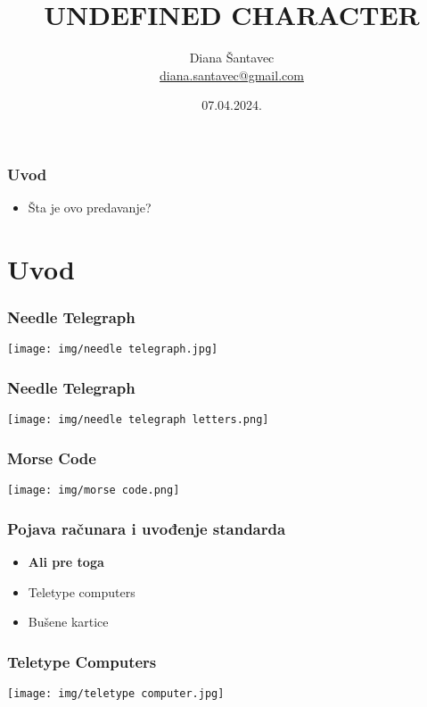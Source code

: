 \documentclass{beamer}
\title{UNDEFINED CHARACTER}
\author[Diana Šantavec]{Diana Šantavec \\ \small \url{diana.santavec@gmail.com}}
\institute{Istraživačka stanica Petnica}
\date{07.04.2024.}
\begin{document}
\frame{\titlepage}


\begin{frame}
\frametitle{Uvod}
\begin{itemize}
  \item Šta je ovo predavanje?
\end{itemize}
\end{frame}

\section*{Uvod}
\begin{frame}
  \frametitle{Needle Telegraph}
  \begin{center}
    \texttt{[image: img/needle telegraph.jpg]}
  \end{center}
\end{frame}

\begin{frame}
  \frametitle{Needle Telegraph}
  \begin{center}
    \texttt{[image: img/needle telegraph letters.png]}
  \end{center}
\end{frame}

\begin{frame}
  \frametitle{Morse Code}

  \begin{center}
    \texttt{[image: img/morse code.png]}
  \end{center}
\end{frame}

\begin{frame}
  \frametitle{Pojava računara i uvođenje standarda}
  \begin{itemize}
    \item \textbf{Ali pre toga} \newline
    \item Teletype computers \newline
    \item Bušene kartice
  \end{itemize}
\end{frame}

\begin{frame}
  \frametitle{Teletype Computers}
  \begin{center}
    \texttt{[image: img/teletype computer.jpg]}
  \end{center}
\end{frame}
\end{document}
